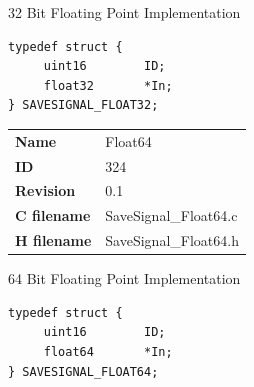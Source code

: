 32 Bit Floating Point Implementation

\begin{lstlisting}
typedef struct {
     uint16        ID;
     float32       *In;
} SAVESIGNAL_FLOAT32;
\end{lstlisting}

\ifdefined \AddTestReports
{}
\fi
{}
\nopagebreak[0]
\begin{tabular}{l l}
\textbf{Name} & Float64 \tabularnewline
\textbf{ID} & 324 \tabularnewline
\textbf{Revision} & 0.1 \tabularnewline
\textbf{C filename} & SaveSignal\_Float64.c \tabularnewline
\textbf{H filename} & SaveSignal\_Float64.h \tabularnewline
\end{tabular}
\vspace{1ex}

64 Bit Floating Point Implementation

\begin{lstlisting}
typedef struct {
     uint16        ID;
     float64       *In;
} SAVESIGNAL_FLOAT64;
\end{lstlisting}

\ifdefined \AddTestReports
{}
\fi
